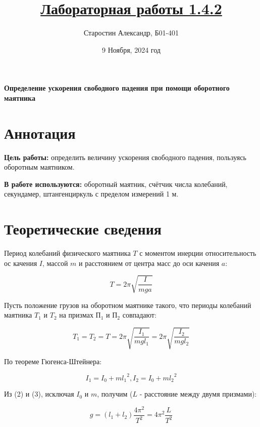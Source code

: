 \documentclass[a4paper]{article}
\title{\underline{Лабораторная работы 1.4.2}}
\author{Старостин Александр, Б01-401}
\date {9 Ноября, 2024 год}
\begin{document}
\maketitle
\newpage

\textbf{Определение ускорения свободного падения при помощи оборотного маятника}

\section{Аннотация}
    \par \textbf{Цель работы:} определить величину ускорения свободного падения, пользуясь оборотным маятником.\\

    \par \textbf{В работе используются:} оборотный маятник, счётчик числа колебаний, секундамер, штангенциркуль с пределом измерений 1 м.

\section{Теоретические сведения}

Период колебаний физического маятника $T$ с моментом инерции относительность ос качения $I$, массой $m$ и расстоянием от центра масс до оси качения $a$:

\begin{equation}
	T = 2\pi\sqrt{\frac{I}{mga}}
\end{equation}

Пусть положение грузов на оборотном маятнике такого, что периоды колебаний маятника $T_1$ и $T_2$ на призмах $\text{П}_1$ и $\text{П}_2$ совпадают:

\begin{equation}
	T_1 = T_2 = T = 2\pi\sqrt{\frac{I_1}{mgl_1}} = 2\pi\sqrt{\frac{I_2}{mgl_2}}
\end{equation}

По теореме Гюгенса-Штейнера:

\begin{equation}
	I_1 = I_0 + m{l_1}^2,   I_2 = I_0 + m{l_2}^2
\end{equation}

Из (2) и (3), исключая $I_0$ и $m$, получим ($L$ - расстояние между двумя призмами):

\begin{equation}
	g = (l_1 + l_2) \frac{4\pi^2}{T^2} = 4\pi^2 \frac{L}{T^2}
\end{equation}
\end{document}
